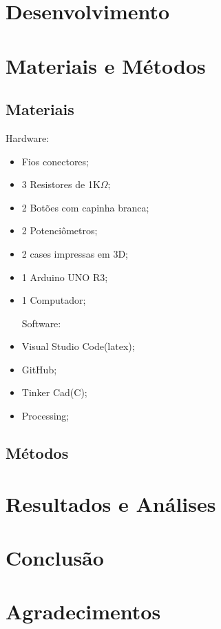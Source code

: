 \documentclass[conference]{IEEEtran}
\begin{document}
\section{Desenvolvimento}

\section{Materiais e Métodos}

\subsection{Materiais}
Hardware:
\begin{itemize}

\item Fios conectores;
\item 3 Resistores de 1K$\Omega; $ 
\item 2 Botões com capinha branca;
\item 2 Potenciômetros;
\item 2 cases impressas em 3D;
\item 1 Arduino UNO R3;
\item 1 Computador; \vspace*{0.5cm}

Software:

\item Visual Studio Code(latex);
\item GitHub;
\item Tinker Cad(C);
\item Processing; 
\end{itemize}

\subsection{Métodos}


\section{Resultados e Análises}

\section{Conclusão}








\section*{Agradecimentos}
\end{document}
